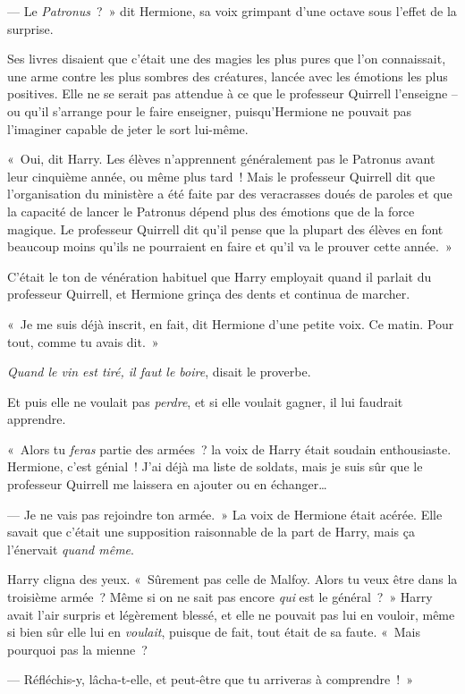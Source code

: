 --- Le \emph{Patronus}~?~»
dit Hermione, sa voix grimpant d'une octave sous l'effet de la surprise.

Ses livres disaient que c'était une des magies les plus pures que l'on connaissait, une arme contre les plus sombres des créatures, lancée avec les émotions les plus positives.
Elle ne se serait pas attendue à ce que le professeur Quirrell l'enseigne -- ou qu'il s'arrange pour le faire enseigner, puisqu'Hermione ne pouvait pas l'imaginer capable de jeter le sort lui-même.

«~Oui, dit Harry.
Les élèves n'apprennent généralement pas le Patronus avant leur cinquième année, ou même plus tard~!
Mais le professeur Quirrell dit que l'organisation du ministère a été faite par des veracrasses doués de paroles et que la capacité de lancer le Patronus dépend plus des émotions que de la force magique.
Le professeur Quirrell dit qu'il pense que la plupart des élèves en font beaucoup moins qu'ils ne pourraient en faire et qu'il va le prouver cette année.~»

C'était le ton de vénération habituel que Harry employait quand il parlait du professeur Quirrell, et Hermione grinça des dents et continua de marcher.

«~Je me suis déjà inscrit, en fait, dit Hermione d'une petite voix.
Ce matin.
Pour tout, comme tu avais dit.~»

\emph{Quand le vin est tiré, il faut le boire}, disait le proverbe.

Et puis elle ne voulait pas \emph{perdre}, et si elle voulait gagner, il lui faudrait apprendre.

«~Alors tu \emph{feras} partie des armées~? la voix de Harry était soudain enthousiaste.
Hermione, c'est génial~!
J'ai déjà ma liste de soldats, mais je suis sûr que le professeur Quirrell me laissera en ajouter ou en échanger…

--- Je ne vais pas rejoindre ton armée.~»
La voix de Hermione était acérée.
Elle savait que c'était une supposition raisonnable de la part de Harry, mais ça l'énervait \emph{quand même}.

Harry cligna des yeux.
«~Sûrement pas celle de Malfoy.
Alors tu veux être dans la troisième armée~?
Même si on ne sait pas encore \emph{qui} est le général~?~»
Harry avait l'air surpris et légèrement blessé, et elle ne pouvait pas lui en vouloir, même si bien sûr elle lui en \emph{voulait}, puisque de fait, tout était de sa faute.
«~Mais pourquoi pas la mienne~?

--- Réfléchis-y, lâcha-t-elle, et peut-être que tu arriveras à comprendre~!~»

